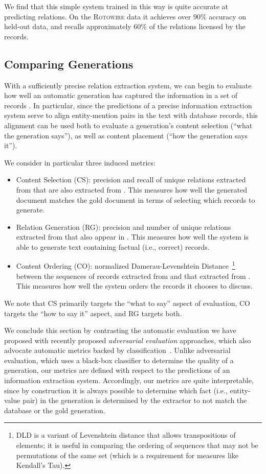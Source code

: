 \documentclass[11pt,letterpaper]{article}
\begin{document}
\noindent We find that this simple system trained in this way is
quite accurate at predicting relations. On the \textsc{Rotowire}
data it achieves over 90\% accuracy on held-out data, and recalls approximately 60\% of the relations licensed by the records.

\subsection{Comparing Generations} 
\label{sec:comparing}
With a sufficiently precise relation extraction system, we can begin to evaluate how well an automatic generation  has captured the information in a set of records . In particular, since the predictions of a precise information extraction system serve to align entity-mention pairs in the text with database records, this alignment can be used both to evaluate a generation's content selection (``what the generation says''), as well as content placement (``how the generation says it'').

We consider in particular three induced metrics:
\begin{itemize}
\item Content Selection (CS): precision and recall of unique relations  extracted from  that are also extracted from . This measures how well the generated document matches the gold document in terms of selecting which records to generate. 
\item Relation Generation (RG): precision and number of unique relations  extracted from  that also appear in . This measures how well the system is able to generate text containing factual (i.e., correct) records. 
\item Content Ordering (CO): normalized Damerau-Levenshtein
  Distance~\cite{brill2000improved}\footnote{DLD is a variant of
    Levenshtein distance that allows transpositions of elements; it is useful in comparing the
    ordering of sequences that may not be permutations of the same set (which is a requirement for measures like Kendall's Tau). }
  between the sequences of records extracted from  and that extracted
  from . This measures how well the system orders the records it chooses to discuss.
\end{itemize} 

\noindent We note that CS primarily targets the ``what to say'' aspect of evaluation, CO targets the ``how to say it'' aspect, and RG targets both. 

We conclude this section by contrasting the automatic evaluation we have proposed with recently proposed \textit{adversarial evaluation} approaches, which also advocate automatic metrics backed by classification~\cite{bowman2016generating,kannan2016adversarial, li2017adversarial}. Unlike adversarial evaluation, which uses a black-box classifier to determine the quality of a generation, our metrics are defined with respect to the predictions of an information extraction system. Accordingly, our metrics are quite interpretable, since by construction it is always possible to determine which fact (i.e., entity-value pair) in the generation is determined by the extractor to not match the database or the gold generation.
\end{document}
